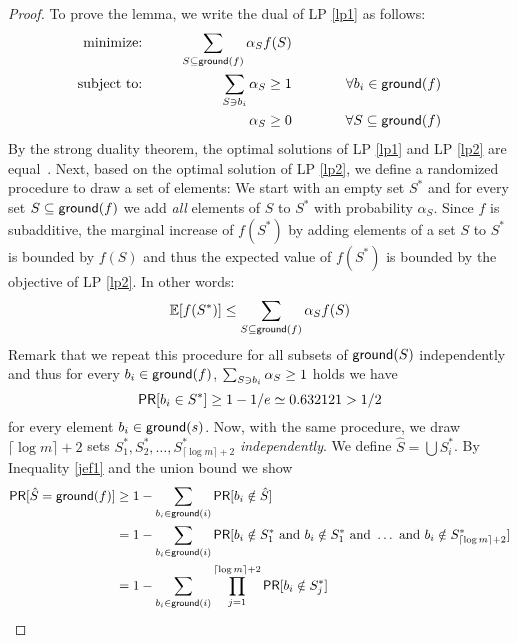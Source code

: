 \begin{proof}
To prove the lemma, we write the dual of LP \ref{lp1} as follows:
\begin{alignat}{3}\label{lp2}
\text{minimize: }& \hspace{0.5cm}& \sum_{S \subseteq \mathsf{ground}(f)} \alpha_S f(S)   & &\\
\text{subject to: }& & \sum_{S \ni b_i} \alpha_S \geq 1 & \hspace{1cm}&\forall b_i \in \mathsf{ground}(f)\nonumber\\
& & \alpha_S \geq 0 & &\forall S \subseteq \mathsf{ground}(f)\nonumber
\end{alignat}
By the strong duality theorem, the optimal solutions of LP \ref{lp1} and LP \ref{lp2} are equal~\cite{bachem1992linear}. Next, based on the optimal solution of LP \ref{lp2}, we define a randomized procedure to draw a set of elements: We start with an empty set $S^*$ and for every set $S \subseteq \mathsf{ground}(f)$ we add \textit{all} elements of $S$ to $S^*$ with probability $\alpha_S$. Since $f$ is subadditive, the marginal increase of $f(S^*)$ by adding elements of a set $S$ to $S^*$ is bounded by $f(S)$ and thus the expected value of $f(S^*)$ is bounded by the objective of LP \ref{lp2}. In other words:
\begin{equation}\label{jef0}
\mathbb{E}[f(S^*)] \leq \sum_{S \subseteq \mathsf{ground}(f)} \alpha_S f(S)
\end{equation}
Remark that we repeat this procedure for all subsets of $\mathsf{ground}(S)$ independently and thus for every $b_i \in \mathsf{ground}(f)$, $\sum_{S \ni b_i} \alpha_S \geq 1$ holds we have
\begin{equation}\label{jef1}
\mathsf{PR}[b_i \in S^*] \geq 1-1/e \simeq 0.632121 > 1/2
\end{equation}
for every element $b_i \in \mathsf{ground}(s)$. Now, with the same procedure, we draw $\lceil \log m \rceil + 2$ sets $S^*_1, S^*_2, \ldots, S^*_{\lceil \log m \rceil + 2}$ \textit{independently}. We define $\hat{S} = \bigcup S^*_i$. By Inequality \eqref{jef1} and the union bound we show
\begin{equation*}
\begin{split}
\mathsf{PR}[\hat{S} = \domp(f)] & \geq 1- \sum_{\ite_i \in \domp(i)} \mathsf{PR}[\ite_i \notin \hat{S}]\\
& = 1- \sum_{\ite_i \in \domp(i)} \mathsf{PR}[\ite_i \notin S^*_1 \text{ and } \ite_i \notin S^*_1 \text{ and } \ldots \text{ and } \ite_i \notin S^*_{\lceil \log m \rceil + 2}]\\
& = 1- \sum_{\ite_i \in \domp(i)} \prod_{j=1}^{\lceil \log m \rceil + 2} \mathsf{PR}[\ite_i \notin S^*_j]\\

\end{split}
\end{equation*}
\end{proof}
